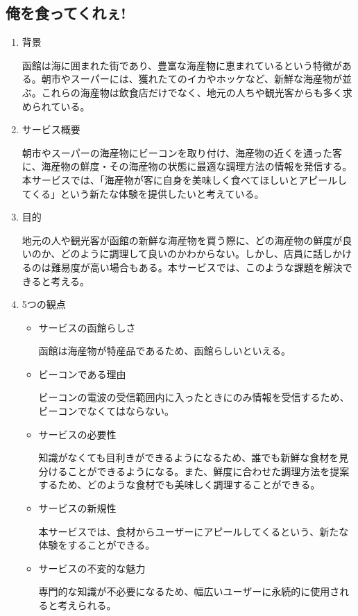 \subsection{俺を食ってくれぇ!}
\begin{enumerate}
    \item 背景
    \par 函館は海に囲まれた街であり、豊富な海産物に恵まれているという特徴がある。朝市やスーパーには、獲れたてのイカやホッケなど、新鮮な海産物が並ぶ。これらの海産物は飲食店だけでなく、地元の人ちや観光客からも多く求められている。
    \item サービス概要
    \par 朝市やスーパーの海産物にビーコンを取り付け、海産物の近くを通った客に、海産物の鮮度・その海産物の状態に最適な調理方法の情報を発信する。本サービスでは、「海産物が客に自身を美味しく食べてほしいとアピールしてくる」という新たな体験を提供したいと考えている。
    \item 目的
    \par 地元の人や観光客が函館の新鮮な海産物を買う際に、どの海産物の鮮度が良いのか、どのように調理して良いのかわからない。しかし、店員に話しかけるのは難易度が高い場合もある。本サービスでは、このような課題を解決できると考える。
    \item 5つの観点
    \begin{itemize}
       \item サービスの函館らしさ
        \par 函館は海産物が特産品であるため、函館らしいといえる。
        \item ビーコンである理由
        \par ビーコンの電波の受信範囲内に入ったときにのみ情報を受信するため、ビーコンでなくてはならない。
        \item サービスの必要性
        \par 知識がなくても目利きができるようになるため、誰でも新鮮な食材を見分けることができるようになる。また、鮮度に合わせた調理方法を提案するため、どのような食材でも美味しく調理することができる。
        \item サービスの新規性
        \par 本サービスでは、食材からユーザーにアピールしてくるという、新たな体験をすることができる。
        \item サービスの不変的な魅力
        \par 専門的な知識が不必要になるため、幅広いユーザーに永続的に使用されると考えられる。
    \end{itemize}
\end{enumerate}

